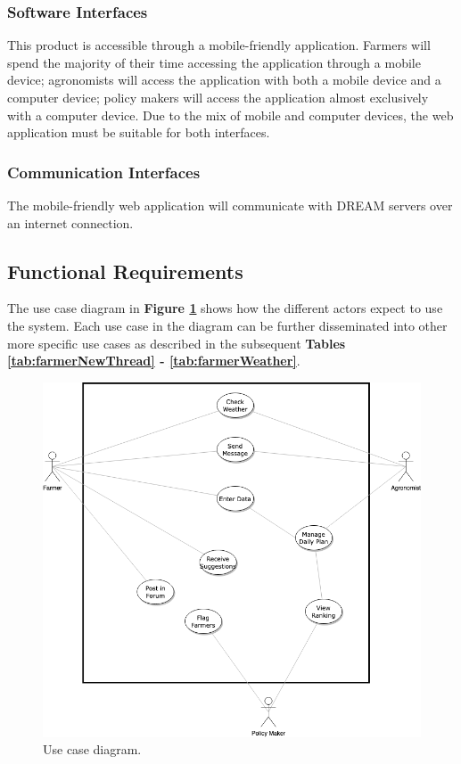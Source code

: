 \subsubsection{Software Interfaces}
This product is accessible through a mobile-friendly application. Farmers will spend the majority of their time accessing the application through a mobile device; agronomists will access the application with both a mobile device and a computer device; policy makers will access the application almost exclusively with a computer device. Due to the mix of mobile and computer devices, the web application must be suitable for both interfaces.


\subsubsection{Communication Interfaces}
The mobile-friendly web application will communicate with DREAM servers over an internet connection.

\newpage
\subsection{Functional Requirements}

\setcounter{usecase_counter}{1}

The use case diagram in \textbf{Figure \ref{fig:usecase}} shows how the different actors expect to use the system. Each use case in the diagram can be further disseminated into other more specific use cases as described in the subsequent \textbf{Tables \ref{tab:farmerNewThread} - \ref{tab:farmerWeather}}.
\begin{figure}[htb!]
\centering
\includegraphics[scale=0.6]{../images_diagrams/usecasediagram.png}
\caption{\label{fig:usecase}Use case diagram.}
\end{figure}

